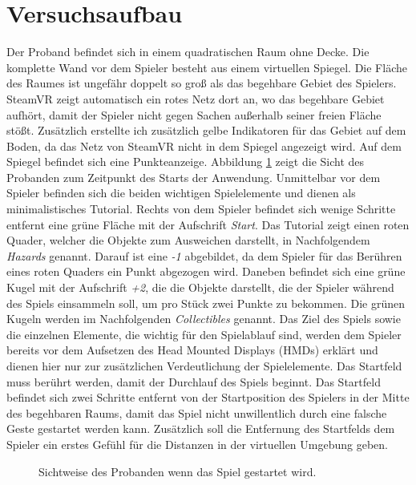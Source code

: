 \section{Versuchsaufbau}
Der Proband befindet sich in einem quadratischen Raum ohne Decke. Die komplette Wand vor dem Spieler besteht aus einem virtuellen Spiegel. Die Fläche des Raumes ist ungefähr doppelt so groß als das begehbare Gebiet des Spielers. SteamVR zeigt automatisch ein rotes Netz dort an, wo das begehbare Gebiet aufhört, damit der Spieler nicht gegen Sachen außerhalb seiner freien Fläche stößt. Zusätzlich erstellte ich zusätzlich gelbe Indikatoren für das Gebiet auf dem Boden, da das Netz von SteamVR nicht in dem Spiegel angezeigt wird. Auf dem Spiegel befindet sich eine Punkteanzeige.
Abbildung \ref{fig:povSetup} zeigt die Sicht des Probanden zum Zeitpunkt des Starts der Anwendung. Unmittelbar vor dem Spieler befinden sich die beiden wichtigen Spielelemente und dienen als minimalistisches Tutorial. Rechts von dem Spieler befindet sich wenige Schritte entfernt eine grüne Fläche mit der Aufschrift \textit{Start}. Das Tutorial zeigt einen roten Quader, welcher die Objekte zum Ausweichen darstellt, in Nachfolgendem \textit{Hazards} genannt. Darauf ist eine \textit{-1} abgebildet, da dem Spieler für das Berühren eines roten Quaders ein Punkt abgezogen wird. Daneben befindet sich eine grüne Kugel mit der Aufschrift \textit{+2}, die die Objekte darstellt, die der Spieler während des Spiels einsammeln soll, um pro Stück zwei Punkte zu bekommen. Die grünen Kugeln werden im Nachfolgenden \textit{Collectibles} genannt. Das Ziel des Spiels sowie die einzelnen Elemente, die wichtig für den Spielablauf sind, werden dem Spieler bereits vor dem Aufsetzen des Head Mounted Displays (HMDs) erklärt und dienen hier nur zur zusätzlichen Verdeutlichung der Spielelemente. 
Das Startfeld muss berührt werden, damit der Durchlauf des Spiels beginnt. Das Startfeld befindet sich zwei Schritte entfernt von der Startposition des Spielers in der Mitte des begehbaren Raums, damit das Spiel nicht unwillentlich durch eine falsche Geste gestartet werden kann. Zusätzlich soll die Entfernung des Startfelds dem Spieler ein erstes Gefühl für die Distanzen in der virtuellen Umgebung geben.

\begin{figure}[h]
  \caption[Aktuelles Setup der Anwendung]{Sichtweise des Probanden wenn das Spiel gestartet wird.}
  \label{fig:povSetup}
\end{figure}

